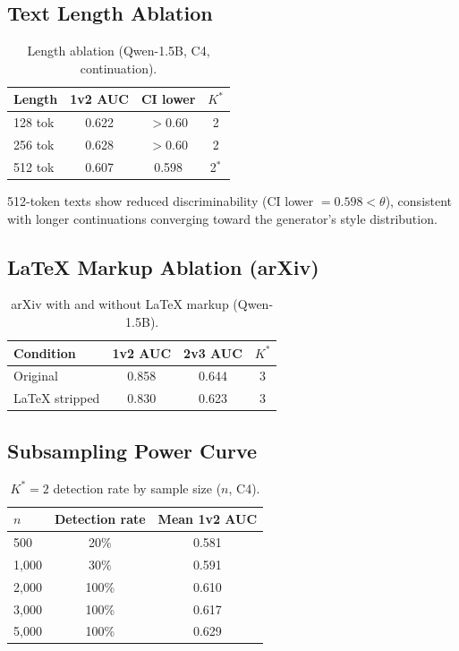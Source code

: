\documentclass[11pt,a4paper]{article}
\begin{document}
\subsection{Text Length Ablation}

\begin{table}[h]
\centering
\small
\caption{Length ablation (Qwen-1.5B, C4, continuation).}
\label{tab:length}
\begin{tabular}{lccc}
\toprule
Length & 1v2 AUC & CI lower & $K^*$ \\
\midrule
128 tok & 0.622 & $>$0.60 & 2 \\
256 tok & 0.628 & $>$0.60 & 2 \\
512 tok & 0.607 & 0.598 & 2$^*$ \\
\bottomrule
\end{tabular}
\end{table}

512-token texts show reduced discriminability (CI lower $= 0.598 < \theta$), consistent with longer continuations converging toward the generator's style distribution.

\subsection{LaTeX Markup Ablation (arXiv)}

\begin{table}[h]
\centering
\small
\caption{arXiv with and without LaTeX markup (Qwen-1.5B).}
\label{tab:latex}
\begin{tabular}{lccc}
\toprule
Condition & 1v2 AUC & 2v3 AUC & $K^*$ \\
\midrule
Original       & 0.858 & 0.644 & 3 \\
LaTeX stripped  & 0.830 & 0.623 & 3 \\
\bottomrule
\end{tabular}
\end{table}

\subsection{Subsampling Power Curve}

\begin{table}[h]
\centering
\small
\caption{$K^*\!=\!2$ detection rate by sample size ($n$, C4).}
\label{tab:power}
\begin{tabular}{lcc}
\toprule
$n$ & Detection rate & Mean 1v2 AUC \\
\midrule
500   & 20\% & 0.581 \\
1,000 & 30\% & 0.591 \\
2,000 & 100\% & 0.610 \\
3,000 & 100\% & 0.617 \\
5,000 & 100\% & 0.629 \\
\bottomrule
\end{tabular}
\end{table}
\end{document}
